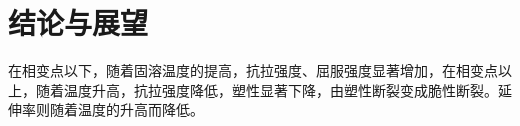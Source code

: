 \chapter{结论与展望}

在相变点以下，随着固溶温度的提高，抗拉强度、屈服强度显著增加，在相变点以上，随着温度升高，抗拉强度降低，塑性显著下降，由塑性断裂变成脆性断裂。延伸率则随着温度的升高而降低。

